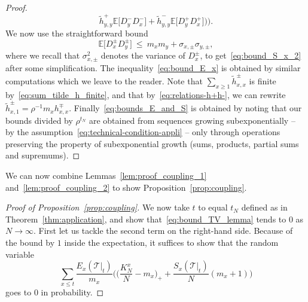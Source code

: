 \begin{refsegment}
\begin{proof}
\[  \tilde{h}^+_{y,y}\mathbb{E}\big[D_y^-D_x^-\big] +
  \tilde{h}^-_{y,y}\mathbb{E}\big[D_y^+D_x^+\big] \Big)\Big).
\]
We now use the straightforward bound
\[
  \mathbb{E}\big[D^\pm_xD^\pm_y\big]\ \leq\ m_xm_y + \sigma_{x,\pm}\sigma_{y,\pm},
\]
where we recall that $\sigma^2_{x,\pm}$ denotes the variance of
$D^\pm_x$, to get~\eqref{eq:bound_S_x_2} after some simplification.
The inequality~\eqref{eq:bound_E_x} is obtained by similar
computations which we leave to the reader. Note that $\sum_{x\geq
  1}\tilde{h}^\pm_{x,x}$ is finite by~\eqref{eq:sum_tilde_h_finite}, and
that by~\eqref{eq:relations-h+h-}, we can rewrite $\tilde{h}^\pm_{x,1}
= \rho^{-1} m_x h^\mp_{x,x}$.
Finally~\eqref{eq:bounds_E_and_S} is obtained by noting that our
bounds divided by $\rho^{t_N}$ are obtained from sequences growing
subexponentially -- by the
assumption~\eqref{eq:technical-condition-appli} -- only through
operations preserving the property of subexponential growth (sums,
products, partial sums and supremums).
\end{proof}

We can now combine Lemmas~\ref{lem:proof_coupling_1}
and~\ref{lem:proof_coupling_2} to show Proposition~\ref{prop:coupling}.

\begin{proof}[Proof of Proposition~\ref{prop:coupling}]
We now take $t$ to equal $t_N$ defined as in
Theorem~\ref{thm:application}, and show
that~\eqref{eq:bound_TV_lemma} tends to $0$ as $N\to\infty$. First let
us tackle the second term on the right-hand side. Because
of the bound by $1$ inside the expectation, it suffices to show that
the random variable
\begin{equation}
  \label{eq:rv_goes_to_0}
    \sum_{x\leq
      t}\frac{E_x(\mathcal{T}|_{t})}{m_x} \bigg(
      \Big(\frac{{K}_N^{x}}{N} - m_{x}\Big)_+
      +\frac{S_x(\mathcal{T}|_{t})}{N} (m_x + 1) \bigg)
\end{equation}
goes to $0$ in probability.


\end{proof}
\end{refsegment}
